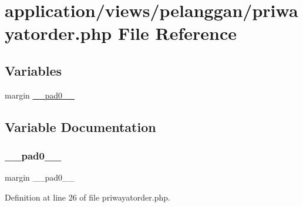 \hypertarget{priwayatorder_8php}{}\section{application/views/pelanggan/priwayatorder.php File Reference}
\label{priwayatorder_8php}
\subsection*{Variables}
\begin{DoxyCompactItemize}
\item 
margin \mbox{\hyperlink{priwayatorder_8php_a03346576b6acd300639bd7e7018e9f58}{\+\_\+\+\_\+pad0\+\_\+\+\_\+}}
\end{DoxyCompactItemize}


\subsection{Variable Documentation}
\mbox{\label{priwayatorder_8php_a03346576b6acd300639bd7e7018e9f58}} 
\subsubsection{\texorpdfstring{\_\_pad0\_\_}{\_\_pad0\_\_}}
{\footnotesize\ttfamily margin \+\_\+\+\_\+pad0\+\_\+\+\_\+}



Definition at line 26 of file priwayatorder.\+php.

